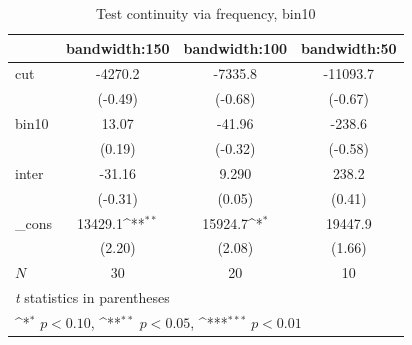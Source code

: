 \documentclass[a4paper,11pt]{article}
\begin{document}
\begin{table}[htbp]\centering
\def\sym#1{\ifmmode^{#1}\else\(^{#1}\)\fi}
\caption{Test continuity via frequency, bin10}
\label{A2.bin10}
\begin{tabular}{l*{3}{c}}
\hline\hline
            &\multicolumn{1}{c}{bandwidth:150}&\multicolumn{1}{c}{bandwidth:100}&\multicolumn{1}{c}{bandwidth:50}\\
\hline
cut         &     -4270.2         &     -7335.8         &    -11093.7         \\
            &     (-0.49)         &     (-0.68)         &     (-0.67)         \\
[1em]
bin10       &       13.07         &      -41.96         &      -238.6         \\
            &      (0.19)         &     (-0.32)         &     (-0.58)         \\
[1em]
inter       &      -31.16         &       9.290         &       238.2         \\
            &     (-0.31)         &      (0.05)         &      (0.41)         \\
[1em]
\_cons      &     13429.1\sym{**} &     15924.7\sym{*}  &     19447.9         \\
            &      (2.20)         &      (2.08)         &      (1.66)         \\
\hline
\(N\)       &          30         &          20         &          10         \\
\hline\hline
\multicolumn{4}{l}{\footnotesize \textit{t} statistics in parentheses}\\
\multicolumn{4}{l}{\footnotesize \sym{*} \(p<0.10\), \sym{**} \(p<0.05\), \sym{***} \(p<0.01\)}\\
\end{tabular}
\end{table}


\end{document}
